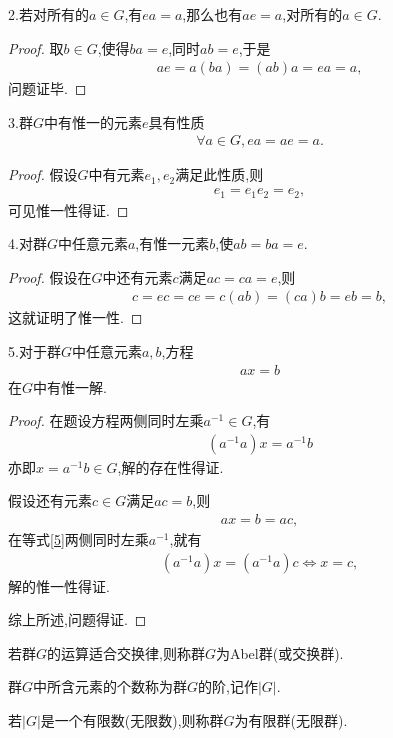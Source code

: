 2.若对所有的$a\in G$,有$ea=a$,那么也有$ae=a$,对所有的$a\in G$.\begin{proof}
    取$b\in G$,使得$ba=e$,同时$ab=e$,于是\begin{align*}
        ae=a(ba)=(ab)a=ea=a,
    \end{align*}问题证毕.
\end{proof}
3.群$G$中有惟一的元素$e$具有性质\begin{align*}
    \forall a\in G,ea=ae=a.
\end{align*}\begin{proof}
    假设$G$中有元素$e_1,e_2$满足此性质,则\begin{align*}
        e_1=e_1e_2=e_2,
    \end{align*}可见惟一性得证.
\end{proof}
4.对群$G$中任意元素$a$,有惟一元素$b$,使$ab=ba=e$.\begin{proof}
    假设在$G$中还有元素$c$满足$ac=ca=e$,则\begin{align*}
        c=ec=ce=c(ab)=(ca)b=eb=b,
    \end{align*}这就证明了惟一性.
\end{proof}
5.对于群$G$中任意元素$a,b$,方程\begin{align*}
    ax=b
\end{align*}在$G$中有惟一解.\begin{proof}
    在题设方程两侧同时左乘$a^{-1}\in G$,有\begin{align*}
        (a^{-1}a)x=a^{-1}b
    \end{align*}亦即$x=a^{-1}b\in G$,解的存在性得证.

    假设还有元素$c\in G$满足$ac=b$,则\begin{align}
        ax=b=ac,\label{5}
    \end{align}在等式\eqref{5}两侧同时左乘$a^{-1}$,就有\begin{align*}
        (a^{-1}a)x=(a^{-1}a)c\iff x=c,
    \end{align*}解的惟一性得证.

    综上所述,问题得证.
\end{proof}
\begin{definition}
    若群$G$的运算适合交换律,则称群$G$为Abel群(或交换群).
\end{definition}
\begin{definition}[阶]
    群$G$中所含元素的个数称为群$G$的阶,记作$|G|$.
\end{definition}
\begin{definition}[有限群与无限群]
    若$|G|$是一个有限数(无限数),则称群$G$为有限群(无限群).
\end{definition}
